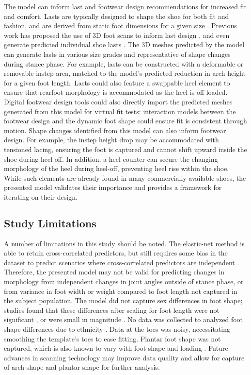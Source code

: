 \documentclass[defaultstyle,11pt]{thesis}
\begin{document}
The model can inform last and footwear design recommendations for increased fit and comfort.
Lasts are typically designed to shape the shoe for both fit and fashion, and are derived from static foot dimensions for a given size \citep{Luximon2013}.
Previous work has proposed the use of 3D foot scans to inform last design \citep{Sambhav2011}, and even generate predicted individual shoe lasts \citep{Amza2019}.
The 3D meshes predicted by the model can generate lasts in various size grades and representative of shape changes during stance phase.
For example, lasts can be constructed with a deformable or removable instep area, matched to the model's predicted reduction in arch height for a given foot length.
Lasts could also feature a swappable heel element to ensure that rearfoot morphology is accommodated as the heel is off-loaded.
Digital footwear design tools could also directly import the predicted meshes generated from this model for virtual fit tests: interaction models between the footwear design and the dynamic foot shape could ensure fit is consistent through motion.
Shape changes identified from this model can also inform footwear design.
For example, the instep height drop may be accommodated with tensioned lacing, ensuring the foot is captured and cannot shift upward inside the shoe during heel-off.
In addition, a heel counter can secure the changing morphology of the heel during heel-off, preventing heel rise within the shoe.
While such elements are already found in many commercially available shoes, the presented model validates their importance and provides a framework for iterating on their design.

\hypertarget{study-limitations}{%
\subsection{Study Limitations}\label{study-limitations}}

A number of limitations in this study should be noted.
The elastic-net method is able to retain cross-correlated predictors, but still requires some bias in the dataset to predict scenarios where cross-correlated predictors are independent \citep{Zou2005}.
Therefore, the presented model may not be valid for predicting changes in morphology from independent changes in joint angles outside of stance phase, or from variance in foot width or weight compared to foot length not captured in the subject population.
The model did not capture sex differences in foot shape; studies found that these differences after scaling for foot length were not significant \citep{Kouchi2009, Barisch-Fritz2014a, Conrad2019}, or were small in magnitude \citep{Wunderlich2001, Krauss2008}.
No data was collected to analyzed foot shape differences due to ethnicity \citep{Jurca2019}.
Data at the toes was noisy, necessitating smoothing the template's toes to ease fitting.
Plantar foot shape was not captured, which is also known to vary with foot shape and loading \citep{Mei2020}.
Future advances in scanning technology may improve data quality and allow for capture of arch shape and plantar shape for further analysis.
\end{document}
